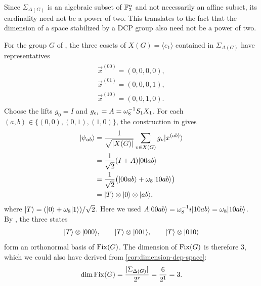 \begin{remark}
    Since $\Sigma_{\Delta(G)}$ is an algebraic subset of $\F_2^n$ and not necessarily an affine subset, its cardinality need not be a power of two. This translates to the fact that the dimension of a space stabilized by a DCP group also need not be a power of two.
\end{remark}

\begin{example}
    For the group $G$ of , the three cosets of $X(G)=\langle e_1\rangle$ contained in $\Sigma_{\Delta(G)}$ have representatives
    \begin{align}
        \begin{split}
            \vec{x}^{(00)}=(0,0,0,0),\\
            \vec{x}^{(01)}=(0,0,0,1),\\
            \vec{x}^{(10)}=(0,0,1,0).
        \end{split}
    \end{align}
    Choose the lifts $g_0=I$ and $g_{e_1}=A=\omega_8^{-1}\S_1X_1$.
    For each $(a,b)\in\{(0,0),(0,1),(1,0)\}$, the construction in  gives
    \begin{align}
        \ket{\psi_{ab}}
        &=\frac{1}{\sqrt{|X(G)|}}
          \sum_{v\in X(G)}g_v\ket{\vec{x}^{(ab)}}\\
        &=\frac{1}{\sqrt{2}}(I+A)\ket{00ab}\\
        &=\frac{1}{\sqrt{2}}
          \big(\ket{00ab}+\omega_8\ket{10ab}\big)\\
        &=\ket{T}\otimes\ket{0}\otimes\ket{ab},
    \end{align}
    where $\ket{T}=(\ket{0}+\omega_8\ket{1})/\sqrt{2}$.
    Here we used $A\ket{00ab}=\omega_8^{-1}i\ket{10ab}=\omega_8\ket{10ab}$.
    By , the three states
    \begin{align}
        \ket{T}\otimes\ket{000},
        \qquad
        \ket{T}\otimes\ket{001},
        \qquad
        \ket{T}\otimes\ket{010}
    \end{align}
    form an orthonormal basis of $\Fix(G)$.
    The dimension of $\Fix(G)$ is therefore 3, which we could also have derived from \cref{cor:dimension-dcp-space}:
    \begin{align}
        \dim\Fix(G)
        =\frac{|\Sigma_{\Delta(G)}|}{2^{r}}
        =\frac{6}{2^1}=3.
    \end{align}
\end{example}

